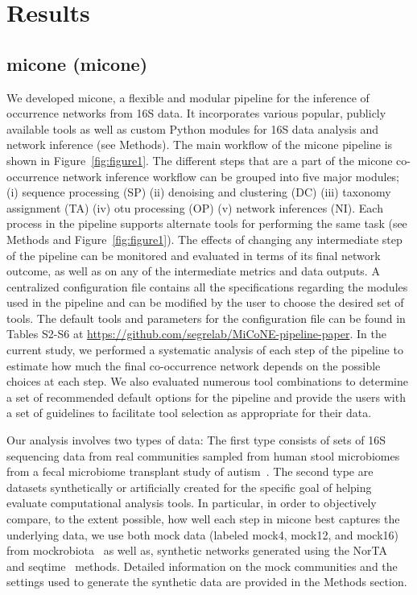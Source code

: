 
\section*{Results}

  \subsection*{\acl{micone} (\acs{micone})}

  We developed \ac{micone}, a flexible and modular pipeline for the inference of occurrence networks from 16S data.
  It incorporates various popular, publicly available tools as well as custom Python modules for 16S data analysis and network inference (see Methods).
  The main workflow of the \ac{micone} pipeline is shown in Figure~\ref{fig:figure1}.
  The different steps that are a part of the \ac{micone} co-occurrence network inference workflow can be grouped into five major modules; (i) sequence processing (SP) (ii) denoising and clustering (DC) (iii) taxonomy assignment (TA) (iv) \ac{otu} processing (OP) (v) network inferences (NI).
  Each process in the pipeline supports alternate tools for performing the same task (see Methods and Figure~\ref{fig:figure1}).
  The effects of changing any intermediate step of the pipeline can be monitored and evaluated in terms of its final network outcome, as well as on any of the intermediate metrics and data outputs.
  A centralized configuration file contains all the specifications regarding the modules used in the pipeline and can be modified by the user to choose the desired set of tools.
  The default tools and parameters for the configuration file can be found in Tables S2-S6 at \href{https://github.com/segrelab/MiCoNE-pipeline-paper}{https://github.com/segrelab/MiCoNE-pipeline-paper}.
  In the current study, we performed a systematic analysis of each step of the pipeline to estimate how much the final co-occurrence network depends on the possible choices at each step.
  We also evaluated numerous tool combinations to determine a set of recommended default options for the pipeline and provide the users with a set of guidelines to facilitate tool selection as appropriate for their data.

  Our analysis involves two types of data: The first type consists of sets of 16S sequencing data from real communities sampled from human stool microbiomes from a fecal microbiome transplant study of autism~\cite{Kang2017}.
  The second type are datasets synthetically or artificially created for the specific goal of helping evaluate computational analysis tools.
  In particular, in order to objectively compare, to the extent possible, how well each step in \ac{micone} best captures the underlying data, we use both mock data (labeled mock4, mock12, and mock16) from mockrobiota~\cite{Bokulich2016} as well as, synthetic networks generated using the NorTA~\cite{Kurtz2015} and seqtime~\cite{Rottjers2018} methods.
  Detailed information on the mock communities and the settings used to generate the synthetic data are provided in the Methods section.

